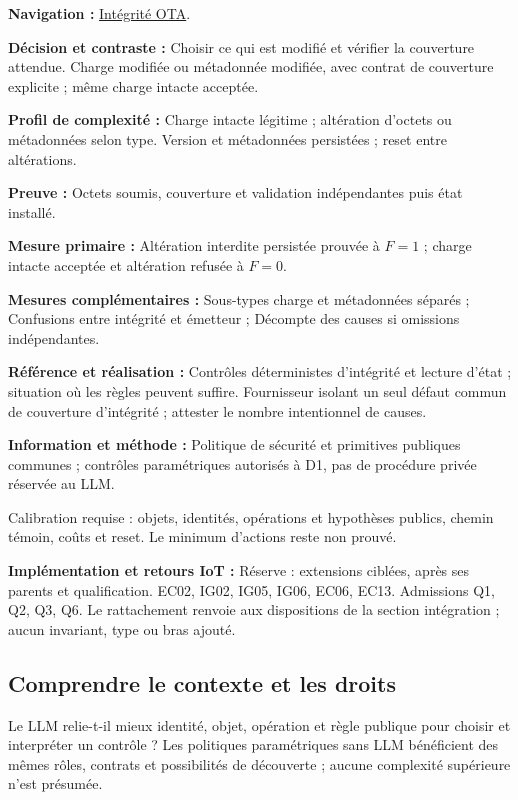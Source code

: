 \documentclass[11pt,a4paper]{article}
\newcommand{\comparisonlink}[2]{\hyperlink{comparison:#1}{#2}}
\begin{document}
\textbf{Navigation :} \comparisonlink{E24}{Intégrité OTA}.

\textbf{Décision et contraste :} Choisir ce qui est modifié et vérifier la couverture attendue. Charge modifiée ou métadonnée modifiée, avec contrat de couverture explicite ; même charge intacte acceptée.

\textbf{Profil de complexité :} Charge intacte légitime ; altération d’octets ou métadonnées selon type. Version et métadonnées persistées ; reset entre altérations.

\textbf{Preuve :} Octets soumis, couverture et validation indépendantes puis état installé.

\textbf{Mesure primaire :} Altération interdite persistée prouvée à $F=1$ ; charge intacte acceptée et altération refusée à $F=0$.

\textbf{Mesures complémentaires :} Sous-types charge et métadonnées séparés ; Confusions entre intégrité et émetteur ; Décompte des causes si omissions indépendantes.

\textbf{Référence et réalisation :} Contrôles déterministes d’intégrité et lecture d’état ; situation où les règles peuvent suffire. Fournisseur isolant un seul défaut commun de couverture d’intégrité ; attester le nombre intentionnel de causes.

\textbf{Information et méthode :} Politique de sécurité et primitives publiques communes ; contrôles paramétriques autorisés à D1, pas de procédure privée réservée au LLM.

Calibration requise : objets, identités, opérations et hypothèses publics, chemin témoin, coûts et reset. Le minimum d’actions reste non prouvé.

\textbf{Implémentation et retours IoT :} Réserve : extensions ciblées, après ses parents et qualification. EC02, IG02, IG05, IG06, EC06, EC13. Admissions Q1, Q2, Q3, Q6. Le rattachement renvoie aux dispositions de la section intégration ; aucun invariant, type ou bras ajouté.

\subsection{Comprendre le contexte et les droits}\label{catalogue:contexte}
Le LLM relie-t-il mieux identité, objet, opération et règle publique pour choisir et interpréter un contrôle ? Les politiques paramétriques sans LLM bénéficient des mêmes rôles, contrats et possibilités de découverte ; aucune complexité supérieure n’est présumée.
\end{document}

